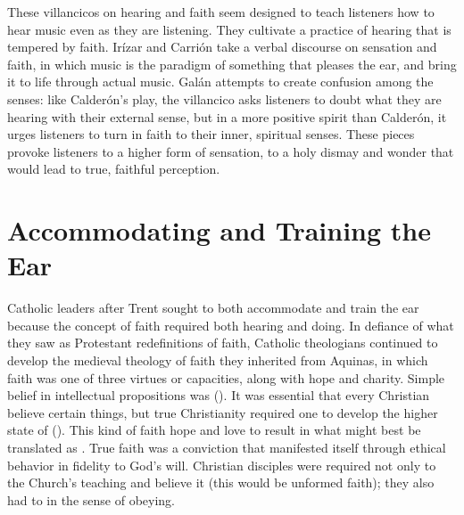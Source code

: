 These villancicos on hearing and faith seem designed to teach listeners how to
hear music even as they are listening. They cultivate a practice of hearing
that is tempered by faith.
Irízar and Carrión take a verbal discourse on sensation and faith, in which
music is the paradigm of something that pleases the ear, and bring it to life
through actual music.
Galán attempts to create confusion among the senses: like Calderón's play, the
villancico asks listeners to doubt what they are hearing with their external
sense, but in a more positive spirit than Calderón, it urges listeners to turn
in faith to their inner, spiritual senses.
These pieces provoke listeners to a higher form of sensation, to a holy dismay
and wonder that would lead to true, faithful perception.

\section{Accommodating and Training the Ear}

Catholic leaders after Trent sought to both accommodate and train the ear
because the concept of faith required both hearing and doing.
In defiance of what they saw as Protestant redefinitions of faith, Catholic
theologians continued to develop the medieval theology of faith they inherited
from Aquinas, in which faith was one of three virtues or capacities, along with
hope and charity.%
    \Autocite[130--132]{Schreiner:Certainty}
Simple belief in intellectual propositions was 
().%
    \Autocite[, 15--20]{Catholic:Catechismus1614}
It was essential that every Christian believe certain things, but true
Christianity required one to develop the higher state of 
().
This kind of faith  hope and love to result in  what
might best be translated as .
True faith was a conviction that manifested itself through ethical behavior in
fidelity to God's will.
Christian disciples were required not only to  the Church's
teaching and believe it (this would be unformed faith); they also had to
 in the sense of obeying.


